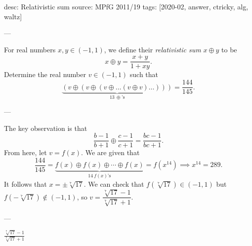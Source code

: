 desc: Relativistic sum
source: MPfG 2011/19
tags: [2020-02, answer, ctricky, alg, waltz]

---

For real numbers $x,y\in(-1,1)$, we define their \emph{relativistic sum} $x\oplus y$ to be \[x\oplus y=\frac{x+y}{1+xy}.\]
Determine the real number $v\in(-1,1)$ such that \[\underbrace{(v\oplus(v\oplus(v\oplus\ldots(v\oplus v)\ldots)))}_{13\ \oplus\text{'s}}=\frac{144}{145}.\]

---

The key observation is that \[\frac{b-1}{b+1}\oplus\frac{c-1}{c+1}=\frac{bc-1}{bc+1}.\]
From here, let $v=f(x)$. We are given that \[\frac{144}{145}=\underbrace{f(x)\oplus f(x)\oplus\cdots\oplus f(x)}_{14\ f(x)\text{'s}}=f\left(x^{14}\right)\implies x^{14}=289.\]
It follows that $x=\pm\sqrt[7]{17}$. We can check that $f(\sqrt[7]{17})\in(-1,1)$ but $f(-\sqrt[7]{17})\notin(-1,1)$, so $v=\dfrac{\sqrt[7]{17}-1}{\sqrt[7]{17}+1}$.

---

$\frac{\sqrt[7]{17}-1}{\sqrt[7]{17}+1}$
